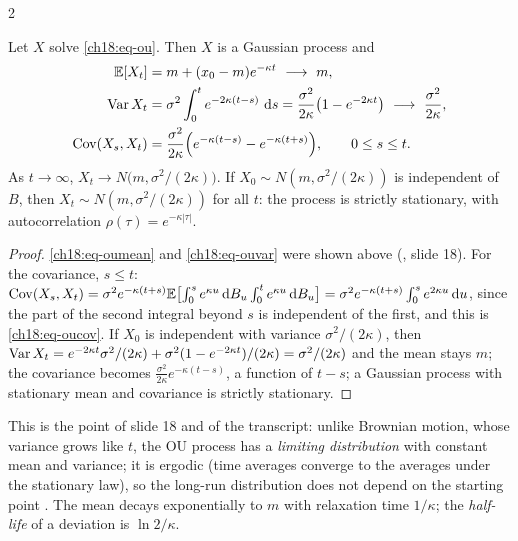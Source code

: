 \begin{paracol}{2}
\begin{proposition}\label{ch18:prop-ouprop}
Let $X$ solve \eqref{ch18:eq-ou}. Then $X$ is a Gaussian process and
\begin{align}
  \E[X_t]&=m+(x_0-m)e^{-\kappa t}\ \longrightarrow\ m, \label{ch18:eq-oumean}\\
  \Var X_t&=\sigma^2\int_0^te^{-2\kappa(t-s)}\,\dd s=\frac{\sigma^2}{2\kappa}\bigl(1-e^{-2\kappa t}\bigr)\ \longrightarrow\ \frac{\sigma^2}{2\kappa}, \label{ch18:eq-ouvar}\\
  \Cov(X_s,X_t)&=\frac{\sigma^2}{2\kappa}\Bigl(e^{-\kappa(t-s)}-e^{-\kappa(t+s)}\Bigr),\qquad 0\le s\le t. \label{ch18:eq-oucov}
\end{align}
As $t\to\infty$, $X_t\to N\bigl(m,\sigma^2/(2\kappa)\bigr)$. If $X_0\sim N(m,\sigma^2/(2\kappa))$ is independent of $B$, then $X_t\sim N(m,\sigma^2/(2\kappa))$ for all $t$: the process is strictly stationary, with autocorrelation $\rho(\tau)=e^{-\kappa|\tau|}$.
\end{proposition}
\begin{proof}
\eqref{ch18:eq-oumean} and \eqref{ch18:eq-ouvar} were shown above (, slide 18). For the covariance, $s\le t$: $\operatorname{Cov}(X_s,X_t)=\sigma^2e^{-\kappa(t+s)}\mathbb{E}\bigl[\int_0^se^{\kappa u}\,\mathrm{d} B_u\int_0^te^{\kappa u}\,\mathrm{d} B_u\bigr]=\sigma^2e^{-\kappa(t+s)}\int_0^se^{2\kappa u}\,\mathrm{d} u$, since the part of the second integral beyond $s$ is independent of the first, and this is \eqref{ch18:eq-oucov}. If $X_0$ is independent with variance $\sigma^2/(2\kappa)$, then $\operatorname{Var} X_t=e^{-2\kappa t}\sigma^2/(2\kappa)+\sigma^2(1-e^{-2\kappa t})/(2\kappa)=\sigma^2/(2\kappa)$ and the mean stays $m$; the covariance becomes $\frac{\sigma^2}{2\kappa}e^{-\kappa(t-s)}$, a function of $t-s$; a Gaussian process with stationary mean and covariance is strictly stationary.
\end{proof}
This is the point of slide 18 and of the transcript: unlike Brownian motion, whose variance grows like $t$, the OU process has a \emph{limiting distribution} with constant mean and variance; it is ergodic (time averages converge to the averages under the stationary law), so the long-run distribution does not depend on the starting point . The mean decays exponentially to $m$ with relaxation time $1/\kappa$; the \emph{half-life} of a deviation is $\ln2/\kappa$.


\end{paracol}
